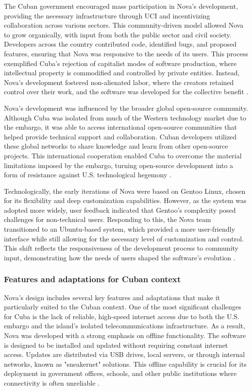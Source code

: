 \begin{refsection}
The Cuban government encouraged mass participation in Nova’s development, providing the necessary infrastructure through UCI and incentivizing collaboration across various sectors. This community-driven model allowed Nova to grow organically, with input from both the public sector and civil society. Developers across the country contributed code, identified bugs, and proposed features, ensuring that Nova was responsive to the needs of its users. This process exemplified Cuba's rejection of capitalist modes of software production, where intellectual property is commodified and controlled by private entities. Instead, Nova's development fostered non-alienated labor, where the creators retained control over their work, and the software was developed for the collective benefit \cite[pp.~23-45]{perez}.

Nova’s development was influenced by the broader global open-source community. Although Cuba was isolated from much of the Western technology market due to the embargo, it was able to access international open-source communities that helped provide technical support and collaboration. Cuban developers utilized these global networks to share knowledge and learn from other open-source projects. This international cooperation enabled Cuba to overcome the material limitations imposed by the embargo, turning open-source development into a form of resistance against U.S. technological hegemony \cite[pp.~12-34]{kapcia}.

Technologically, the early iterations of Nova were based on Gentoo Linux, chosen for its flexibility and deep customization capabilities. However, as the system was adopted more widely, user feedback indicated that Gentoo’s complexity posed challenges for non-technical users. Responding to this, the Nova team transitioned to an Ubuntu-based system, which provided a more user-friendly interface while still allowing for the necessary level of customization and control. This shift reflects the responsiveness of the development process to community input, demonstrating how the needs of users shaped the software’s evolution \cite[pp.~56-78]{feinberg}.

\subsubsection{Features and adaptations for Cuban context}

Nova’s design includes several key features and adaptations that make it particularly suited to the Cuban context. One of the most significant challenges for Cuba is the lack of reliable, high-speed internet access due to both the U.S. embargo and the island’s isolated telecommunications infrastructure. As a result, Nova was developed with a strong emphasis on offline functionality. The software is designed to be installed and updated without requiring constant internet access. Updates are distributed via USB drives, local servers, or through internal networks, known as "sneakernet" solutions. This offline capability is crucial for its deployment in government offices, schools, and other public institutions where connectivity is often unreliable \cite[pp.~135-157]{perez}.


\end{refsection}
